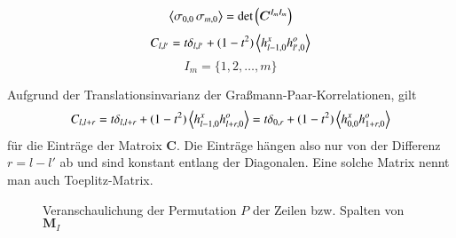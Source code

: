 \begin{grayframe}[frametitle = {Exakte Lösung für Spin-Spin-Korrelation}]
\begin{equation}
 \left\langle \sigma_{0,0}\, \sigma_{m,0} \right\rangle = \mathrm{det}\left( \bm{C}^{I_mI_m} \right)
\end{equation}
\begin{equation}
C_{l,l'} = t \delta_{l,l'} + (1-t^2) \left\langle h_{l-1,0}^x h_{l',0}^o \right\rangle
\end{equation}
\begin{equation}
I_m = \{1,2, \dots, m\} \nonumber
\end{equation}
\end{grayframe}
\newpage
\noindent Aufgrund der Translationsinvarianz der Graßmann-Paar-Korrelationen, gilt
\begin{equation}
C_{l,l+r} = t \delta_{l,l+r} + (1-t^2) \left\langle h_{l-1,0}^x h_{l + r,0}^o \right\rangle = t \delta_{0,r} + (1-t^2) \left\langle h_{0,0}^x h_{1+r,0}^o \right\rangle
\end{equation}
für die Einträge der Matroix $\bm{C}$. Die Einträge hängen also nur von der Differenz $r = l-l'$ ab und sind konstant entlang der Diagonalen. Eine solche Matrix nennt man auch Toeplitz-Matrix.

\begin{figure}[h!]
\centering

\caption{Veranschaulichung der Permutation $P$ der Zeilen bzw. Spalten von $\bm{M}_I$}
\label{Abb: Permutation für M_I}
\end{figure}
